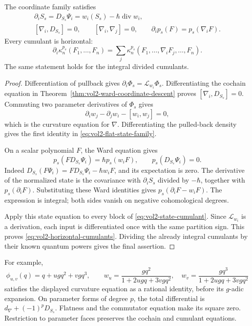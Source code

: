 \begin{proposition}\label{prop:vol2-flat-state-family}
The coordinate family satisfies
\begin{equation}\label{eq:vol2-flat-state-family}
 \begin{gathered}
 \partial_iS_s=D_{S_s}\Psi_i
                  =w_i(S_s)-\hbar\operatorname{div}w_i,\\
 [\nabla_i,D_{S_s}]=0,
 \qquad [\nabla_i,\nabla_j]=0,
 \qquad \partial_i p_s(F)=p_s(\nabla_iF).
 \end{gathered}
\end{equation}
Every cumulant is horizontal:
\begin{equation}\label{eq:vol2-horizontal-cumulants}
 \partial_i\kappa_n^{p_s}(F_1,\ldots,F_n)
  =\sum_j\kappa_n^{p_s}
       (F_1,\ldots,\nabla_iF_j,\ldots,F_n).
\end{equation}
The same statement holds for the integral divided cumulants.
\end{proposition}
\begin{proof}
Differentiation of pullback gives
$\partial_i\Phi_s=\mathcal L_{w_i}\Phi_s$.
Differentiating the cochain equation in
Theorem~\ref{thm:vol2-ward-coordinate-descent} proves
$[\nabla_i,D_{S_s}]=0$.
Commuting two parameter derivatives of $\Phi_s$ gives
\[
 \partial_iw_j-\partial_jw_i-[w_i,w_j]=0,
\]
which is the curvature equation for $\nabla$.
Differentiating the pulled-back density gives the first
identity in \eqref{eq:vol2-flat-state-family}.

On a scalar polynomial $F$, the Ward equation gives
\[
 p_s(FD_{S_s}\Psi_i)=\hbar p_s(w_iF),
 \qquad p_s(D_{S_s}\Psi_i)=0.
\]
Indeed $D_{S_s}(F\Psi_i)=F D_{S_s}\Psi_i-\hbar w_iF$,
and its expectation is zero. The derivative of the
normalized state is the covariance with $\partial_iS_s$
divided by $-\hbar$, together with $p_s(\partial_iF)$.
Substituting these Ward identities gives
$p_s(\partial_iF-w_iF)$. The expression is integral;
both sides vanish on negative cohomological degrees.

Apply this state equation to every block of
\eqref{eq:vol2-state-cumulant}. Since $\mathcal L_{w_i}$
is a derivation, each input is differentiated once with
the same partition sign. This proves
\eqref{eq:vol2-horizontal-cumulants}. Dividing the already
integral cumulants by their known quantum powers gives
the final assertion.
\end{proof}

For example,
\[
 \phi_{u,v}(q)=q+ugq^2+vgq^3,
 \qquad
 w_u=\frac{gq^2}{1+2ugq+3vgq^2},\quad
 w_v=\frac{gq^3}{1+2ugq+3vgq^2}
\]
satisfies the displayed curvature equation as a rational
identity, before its $g$-adic expansion. On parameter forms
of degree $p$, the total differential is
$d_\nabla+(-1)^pD_{S_s}$. Flatness and the commutator
equation make its square zero. Restriction to parameter
faces preserves the cochain and cumulant equations.

